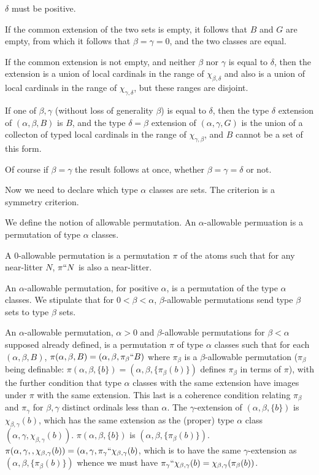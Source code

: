 \documentclass[12pt]{article}
\begin{document}
$\delta$ must be positive.

If the common extension of the two sets is empty, it follows that $B$ and $G$ are empty, from which it follows that $\beta=\gamma=0$, and the two classes are equal.

If the common extension is not empty, and neither $\beta$ nor $\gamma$ is equal to $\delta$, then the extension is a union of local cardinals in the range of
$\chi_{\beta,\delta}$ and also is a union of local cardinals in the range of $\chi_{\gamma,\delta}$, but these ranges are disjoint.

If one of $\beta,\gamma$ (without loss of generality $\beta$) is equal to $\delta$, then the type $\delta$ extension of $(\alpha,\beta,B)$ is $B$,
and the type $\delta=\beta$ extension of $(\alpha,\gamma,G)$ is the union of a collecton of typed local cardinals in the range of $\chi_{\gamma,\beta}$, and $B$ cannot be a set of this form.

Of course if $\beta=\gamma$ the result follows at once, whether $\beta=\gamma=\delta$ or not.

Now we need to declare which type $\alpha$ classes are sets.  The criterion is a symmetry criterion.

We define the notion of allowable permutation.  An $\alpha$-allowable permuation is a permutation of type $\alpha$ classes.

A 0-allowable permutation is a permutation $\pi$ of the atoms such that for any near-litter $N$, $\pi``N$  is also a near-litter.

An $\alpha$-allowable permutation, for positive $\alpha$, is a permutation of the type $\alpha$ classes.  We stipulate that for $0<\beta<\alpha$, $\beta$-allowable permutations send type $\beta$ sets to type $\beta$ sets.

An $\alpha$-allowable permutation, $\alpha>0$ and $\beta$-allowable permutations for $\beta<\alpha$ supposed already defined, is a permutation $\pi$ of type $\alpha$ classes such
that for each $(\alpha,\beta,B)$, $\pi(\alpha,\beta,B)=(\alpha,\beta,\pi_{\beta}``B)$ where $\pi_\beta$ is a $\beta$-allowable permutation ($\pi_\beta$ being definable: $\pi(\alpha,\beta,\{b\}) = (\alpha,\beta,\{\pi_\beta(b)\})$ defines $\pi_\beta$ in terms of $\pi$), with the further
condition that type $\alpha$ classes with the same extension have images under $\pi$ with the same extension.  This last is a coherence condition relating $\pi_\beta$ and $\pi_\gamma$ for $\beta, \gamma$ distinct ordinals less than $\alpha$.
The $\gamma$-extension of $(\alpha,\beta,\{b\})$ is $\chi_{\beta,\gamma}(b)$, which has the same extension as the (proper) type $\alpha$ class $(\alpha,\gamma,\chi_{\beta,\gamma}(b))$.  $\pi(\alpha,\beta,\{b\})$ is $(\alpha,\beta,\{\pi_\beta(b)\})$.
$\pi(\alpha,\gamma,,\chi_{\beta,\gamma}(b)) = (\alpha,\gamma,\pi_{\gamma}``\chi_{\beta,\gamma}(b)$, which is to have the same $\gamma$-extension as $(\alpha,\beta,\{\pi_\beta(b)\})$ whence we must have $\pi_{\gamma}``\chi_{\beta,\gamma}(b) = \chi_{\beta,\gamma}(\pi_\beta(b))$.
\end{document}
